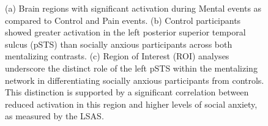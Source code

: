 \begin{figure}[!ht]
	\centering
	\caption{(a) Brain regions with significant activation during Mental events as compared to Control and Pain events. (b) Control participants showed greater activation in the left posterior superior temporal sulcus (pSTS) than socially anxious participants across both mentalizing contrasts. (c) Region of Interest (ROI) analyses underscore the distinct role of the left pSTS within the mentalizing network in differentiating socially anxious participants from controls. This distinction is supported by a significant correlation between reduced activation in this region and higher levels of social anxiety, as measured by the LSAS.}
    \vspace*{-10pt}
	\label{fig:fmri-results-sa}
\end{figure}

